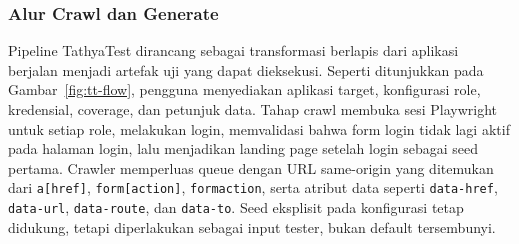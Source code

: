 \documentclass[conference]{IEEEtran}
\begin{document}
\subsubsection{Alur Crawl dan Generate}

Pipeline TathyaTest dirancang sebagai transformasi berlapis dari aplikasi berjalan menjadi artefak uji yang dapat dieksekusi. Seperti ditunjukkan pada Gambar~\ref{fig:tt-flow}, pengguna menyediakan aplikasi target, konfigurasi role, kredensial, coverage, dan petunjuk data. Tahap crawl membuka sesi Playwright untuk setiap role, melakukan login, memvalidasi bahwa form login tidak lagi aktif pada halaman login, lalu menjadikan landing page setelah login sebagai seed pertama. Crawler memperluas queue dengan URL same-origin yang ditemukan dari \texttt{a[href]}, \texttt{form[action]}, \texttt{formaction}, serta atribut data seperti \texttt{data-href}, \texttt{data-url}, \texttt{data-route}, dan \texttt{data-to}. Seed eksplisit pada konfigurasi tetap didukung, tetapi diperlakukan sebagai input tester, bukan default tersembunyi.
\end{document}
